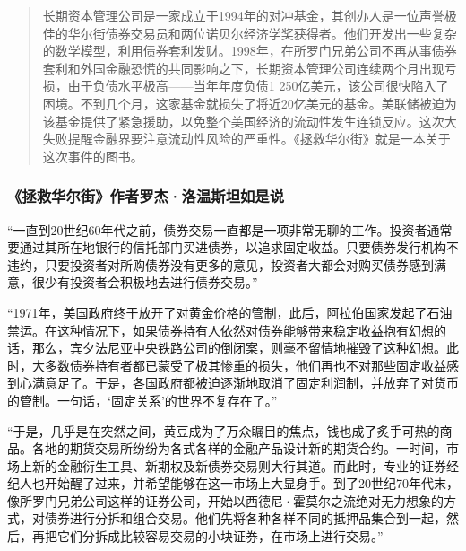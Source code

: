 \begin{quotation}
长期资本管理公司是一家成立于1994年的对冲基金，其创办人是一位声誉极佳的华尔街债券交易员和两位诺贝尔经济学奖获得者。他们开发出一些复杂的数学模型，利用债券套利发财。1998年，在所罗门兄弟公司不再从事债券套利和外国金融恐慌的共同影响之下，长期资本管理公司连续两个月出现亏损，由于负债水平极高——当年年度负债1 250亿美元，该公司很快陷入了困境。不到几个月，这家基金就损失了将近20亿美元的基金。美联储被迫为该基金提供了紧急援助，以免整个美国经济的流动性发生连锁反应。这次大失败提醒金融界要注意流动性风险的严重性。《拯救华尔街》就是一本关于这次事件的图书。
\par
\end{quotation}

\subsubsection*{《拯救华尔街》作者罗杰·洛温斯坦如是说}

“一直到20世纪60年代之前，债券交易一直都是一项非常无聊的工作。投资者通常要通过其所在地银行的信托部门买进债券，以追求固定收益。只要债券发行机构不违约，只要投资者对所购债券没有更多的意见，投资者大都会对购买债券感到满意，很少有投资者会积极地去进行债券交易。”
\par

“1971年，美国政府终于放开了对黄金价格的管制，此后，阿拉伯国家发起了石油禁运。在这种情况下，如果债券持有人依然对债券能够带来稳定收益抱有幻想的话，那么，宾夕法尼亚中央铁路公司的倒闭案，则毫不留情地摧毁了这种幻想。此时，大多数债券持有者都已蒙受了极其惨重的损失，他们再也不对那些固定收益感到心满意足了。于是，各国政府都被迫逐渐地取消了固定利润制，并放弃了对货币的管制。一句话，‘固定关系’的世界不复存在了。”
\par

“于是，几乎是在突然之间，黄豆成为了万众瞩目的焦点，钱也成了炙手可热的商品。各地的期货交易所纷纷为各式各样的金融产品设计新的期货合约。一时间，市场上新的金融衍生工具、新期权及新债券交易则大行其道。而此时，专业的证券经纪人也开始醒了过来，并希望能够在这一市场上大显身手。到了20世纪70年代末，像所罗门兄弟公司这样的证券公司，开始以西德尼·霍莫尔之流绝对无力想象的方式，对债券进行分拆和组合交易。他们先将各种各样不同的抵押品集合到一起，然后，再把它们分拆成比较容易交易的小块证券，在市场上进行交易。”
\par
